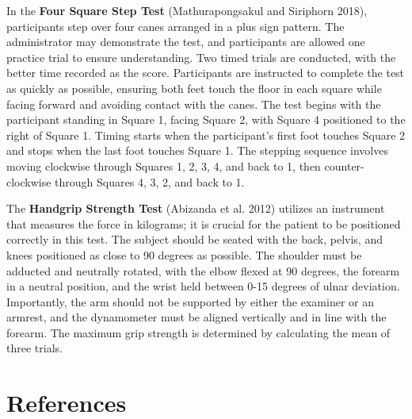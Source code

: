 \documentclass[
  letterpaper,
  DIV=11,
  numbers=noendperiod]{scrartcl}
\begin{document}
In the \textbf{Four Square Step Test} (Mathurapongsakul and Siriphorn
2018), participants step over four canes arranged in a plus sign
pattern. The administrator may demonstrate the test, and participants
are allowed one practice trial to ensure understanding. Two timed trials
are conducted, with the better time recorded as the score. Participants
are instructed to complete the test as quickly as possible, ensuring
both feet touch the floor in each square while facing forward and
avoiding contact with the canes. The test begins with the participant
standing in Square 1, facing Square 2, with Square 4 positioned to the
right of Square 1. Timing starts when the participant's first foot
touches Square 2 and stops when the last foot touches Square 1. The
stepping sequence involves moving clockwise through Squares 1, 2, 3, 4,
and back to 1, then counter-clockwise through Squares 4, 3, 2, and back
to 1.

The \textbf{Handgrip Strength Test} (Abizanda et al. 2012) utilizes an
instrument that measures the force in kilograms; it is crucial for the
patient to be positioned correctly in this test. The subject should be
seated with the back, pelvis, and knees positioned as close to 90
degrees as possible. The shoulder must be adducted and neutrally
rotated, with the elbow flexed at 90 degrees, the forearm in a neutral
position, and the wrist held between 0-15 degrees of ulnar deviation.
Importantly, the arm should not be supported by either the examiner or
an armrest, and the dynamometer must be aligned vertically and in line
with the forearm. The maximum grip strength is determined by calculating
the mean of three trials.

\newpage

\section*{References}\label{references}
\end{document}
